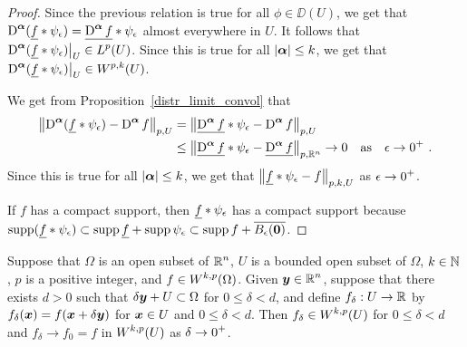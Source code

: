 \begin{proof}
Since the previous relation is true for all $\phi \in \DD(U)$, we get that
$\displaystyle \operatorname{D}^{{\bm{\alpha}}}(\underline{f} \ast \psi_\epsilon)
= \underline{\operatorname{D}^{{\bm{\alpha}}} f} \ast \psi_\epsilon$ almost everywhere in
$U$.  It follows that
$\displaystyle \operatorname{D}^{{\bm{\alpha}}}(\underline{f} \ast
\psi_\epsilon)\big|_U \in L^p(U)$.
Since this is true for all $|{\bm{\alpha}}|\leq k$, we get that
$\displaystyle \operatorname{D}^{{\bm{\alpha}}}(\underline{f} \ast \psi_\epsilon)\big|_U
\in W^{p,k}(U)$.

We get from Proposition~\ref{distr_limit_convol} that
\begin{align*}
\left\| \operatorname{D}^{{\bm{\alpha}}}(\underline{f} \ast \psi_\epsilon)
- \operatorname{D}^{{\bm{\alpha}}} f \right\|_{p,U}
&= \left\| \underline{\operatorname{D}^{{\bm{\alpha}}} f} \ast \psi_\epsilon
- \operatorname{D}^{{\bm{\alpha}}} f \right\|_{p,U} \\
&\leq \left\| \underline{\operatorname{D}^{{\bm{\alpha}}} f} \ast \psi_\epsilon -
\underline{\operatorname{D}^{{\bm{\alpha}}} f} \right\|_{p,\mathbb{R}^n} \to 0 \quad \text{as} \quad
\epsilon \to 0^+ \ .
\end{align*}
Since this is true for all $|{\bm{\alpha}}| \leq k$, we get that
$\displaystyle \left\| \underline{f} \ast \psi_\epsilon - f \right\|_{p,k,U}$
as $\displaystyle \epsilon \to 0^+$.

If $f$ has a compact support, then
$\displaystyle \underline{f} \ast \psi_\epsilon$ has a compact support
because
$\displaystyle \operatorname{supp} (\underline{f} \ast \psi_\epsilon)
\subset \operatorname{supp} \underline{f} + \operatorname{supp} \psi_\epsilon
\subset \operatorname{supp} f + \overline{B_\epsilon({\bm{0}})}$.
\end{proof}

\begin{lemma} \label{sob_denselem3}
Suppose that $\Omega$ is an open subset of $\displaystyle \mathbb{R}^n$,
$U$ is a bounded open subset of $\Omega$,
$k\in \mathbb{N}$, $p$ is a positive integer, and
$\displaystyle f \in W^{k,p}(\Omega)$.
Given $\displaystyle {\bm{y}} \in \mathbb{R}^n$, suppose that there exists
$d>0$ such that $\delta {\bm{y}} + U \subset \Omega$ for
$0 \leq \delta < d$, and
define $f_\delta:U \to \mathbb{R}$ by $f_\delta({\bm{x}}) = f({\bm{x}} + \delta {\bm{y}})$
for ${\bm{x}} \in U$ and $0 \leq \delta < d$.  Then
$\displaystyle f_\delta \in W^{k,p}(U)$ for $0 \leq \delta < d$ and
$f_\delta \to f_0 = f$ in $\displaystyle W^{k,p}(U)$ as
$\displaystyle \delta \to 0^+$.
\end{lemma}


